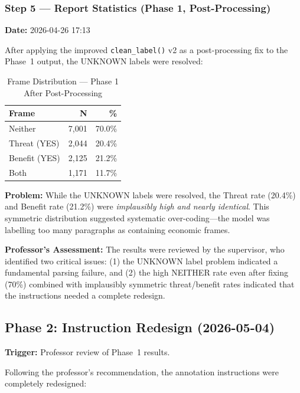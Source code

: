 \subsubsection{Step 5 --- Report Statistics (Phase 1, Post-Processing)}
\label{sec:step5_phase1}

\textbf{Date:} 2026-04-26 17:13

After applying the improved \texttt{clean\_label()} v2 as a post-processing fix to the Phase~1 output, the UNKNOWN labels were resolved:

\begin{table}[H]
\centering
\caption{Frame Distribution --- Phase 1 After Post-Processing}
\begin{tabular}{@{}lrr@{}}
\toprule
\textbf{Frame} & \textbf{N} & \textbf{\%} \\
\midrule
Neither        & 7,001 & 70.0\% \\
Threat (YES)   & 2,044 & 20.4\% \\
Benefit (YES)  & 2,125 & 21.2\% \\
Both           & 1,171 & 11.7\% \\
\bottomrule
\end{tabular}
\end{table}

\textbf{Problem:} While the UNKNOWN labels were resolved, the Threat rate (20.4\%) and Benefit rate (21.2\%) were \textit{implausibly high and nearly identical}. This symmetric distribution suggested systematic over-coding---the model was labelling too many paragraphs as containing economic frames.

\textbf{Professor's Assessment:} The results were reviewed by the supervisor, who identified two critical issues: (1) the UNKNOWN label problem indicated a fundamental parsing failure, and (2) the high NEITHER rate even after fixing (70\%) combined with implausibly symmetric threat/benefit rates indicated that the instructions needed a complete redesign.

\newpage

\subsection{Phase 2: Instruction Redesign (2026-05-04)}
\label{sec:phase2}

\textbf{Trigger:} Professor review of Phase~1 results.

Following the professor's recommendation, the annotation instructions were completely redesigned:


